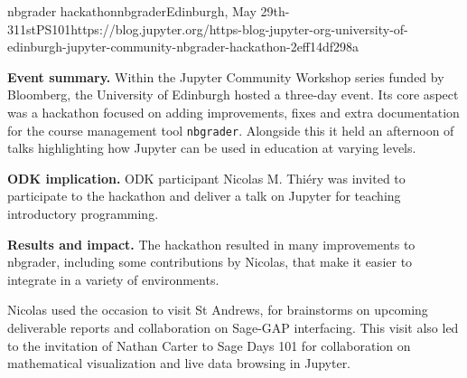 \begin{event}{nbgrader hackathon}{nbgrader}{Edinburgh, May
    29th-311st}{PS}{10}{1}{https://blog.jupyter.org/https-blog-jupyter-org-university-of-edinburgh-jupyter-community-nbgrader-hackathon-2eff14df298a}

  \textbf{Event summary.} Within the Jupyter Community Workshop series
  funded by Bloomberg, the University of Edinburgh hosted a three-day
  event. Its core aspect was a hackathon focused on adding
  improvements, fixes and extra documentation for the course
  management tool \texttt{nbgrader}. Alongside this it held an
  afternoon of talks highlighting how Jupyter can be used in education
  at varying levels.

  \textbf{ODK implication.} ODK participant Nicolas M. Thiéry was
  invited to participate to the hackathon and deliver a talk on
  Jupyter for teaching introductory programming.

  \textbf{Results and impact.} The hackathon resulted in many
  improvements to nbgrader, including some contributions by Nicolas,
  that make it easier to integrate in a variety of environments.

  Nicolas used the occasion to visit St Andrews, for brainstorms on
  upcoming deliverable reports and collaboration on Sage-GAP
  interfacing. This visit also led to the invitation of Nathan Carter
  to Sage Days 101 for collaboration on mathematical visualization and
  live data browsing in Jupyter.
\end{event}
